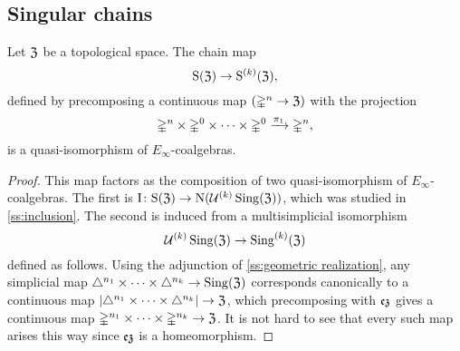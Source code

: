 \subsection{Singular chains} \label{ss:singular}

\begin{theorem*}
	Let $\mathfrak{Z}$ be a topological space.
	The chain map
	\[
	\mathrm{S}(\mathfrak{Z}) \to \mathrm{S}^{(k)}(\mathfrak{Z}),
	\]
	defined by precomposing a continuous map $(\mathbb{\Delta}^n \to \mathfrak{Z})$ with the projection
	\[
	\mathbb{\Delta}^n \times \mathbb{\Delta}^{0}\times\dots\times\mathbb{\Delta}^{0} \xrightarrow{\pi_1} \mathbb{\Delta}^n,
	\]
	is a quasi-isomorphism of $E_\infty$-coalgebras.
\end{theorem*}

\begin{proof}
	This map factors as the composition of two quasi-isomorphism of $E_\infty$-coalgebras.
	The first is $\operatorname{I} \colon \mathrm{S}(\mathfrak{Z}) \to \operatorname{N}(\mathcal{U}^{(k)} \operatorname{Sing}(\mathfrak{Z}))$, which was studied in \cref{ss:inclusion}.
	The second is induced from a multisimplicial isomorphism
	\[
	\mathcal{U}^{(k)} \operatorname{Sing}(\mathfrak{Z}) \to \operatorname{Sing}^{(k)}(\mathfrak{Z})
	\]
	defined as follows.
	Using the adjunction of \cref{ss:geometric realization}, any simplicial map $\triangle^{n_1}\times\dots\times\triangle^{n_k} \to \operatorname{Sing}(\mathfrak{Z})$ corresponds canonically to a continuous map $\lvert\triangle^{n_1}\times\dots\times\triangle^{n_k}\rvert \to \mathfrak{Z}$, which precomposing with $\operatorname{\mathfrak{ez}}$ gives a continuous map $\mathbb{\Delta}^{n_1}\times\dots\times\mathbb{\Delta}^{n_k} \to \mathfrak{Z}$.
	It is not hard to see that every such map arises this way since $\operatorname{\mathfrak{ez}}$ is a homeomorphism.
\end{proof}